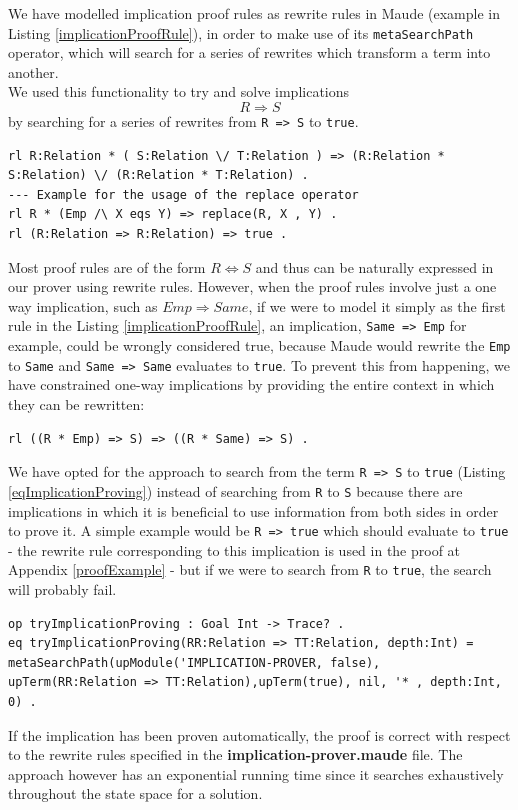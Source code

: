 \documentclass[12pt,a4paper]{article}
\begin{document}
We have modelled implication proof rules as rewrite rules in Maude (example in Listing \ref{implicationProofRule}), in order to make use of its \texttt{metaSearchPath} operator, which will search for a series of rewrites which transform a term into another.
\\
We used this functionality to try and solve implications 
\[
	R \Rightarrow S
\]
by searching for a series of rewrites from \texttt{R => S} to \texttt{true}. 
\\ 
\begin{lstlisting}[label=implicationProofRule,caption=Example of implication rewrite rules]
rl R:Relation * ( S:Relation \/ T:Relation ) => (R:Relation * S:Relation) \/ (R:Relation * T:Relation) .
--- Example for the usage of the replace operator
rl R * (Emp /\ X eqs Y) => replace(R, X , Y) .
rl (R:Relation => R:Relation) => true .
\end{lstlisting}
Most proof rules are of the form \(R \Leftrightarrow S\) and thus can be naturally expressed in our prover using rewrite rules. However, when the proof rules involve just a one way implication, such as \(Emp \Rightarrow Same\), if we were to model it simply as the first rule in the Listing \ref{implicationProofRule}, an implication, \texttt{Same => Emp} for example, could be wrongly considered true, because Maude would rewrite the \texttt{Emp} to \texttt{Same} and \texttt{Same => Same} evaluates to \texttt{true}. To prevent this from happening, we have constrained one-way implications by providing the entire context in which they can be rewritten:
\begin{lstlisting}
rl ((R * Emp) => S) => ((R * Same) => S) .
\end{lstlisting}

We have opted for the approach to search from the term \texttt{R => S} to \texttt{true} (Listing \ref{eqImplicationProving}) instead of searching from \texttt{R} to \texttt{S} because there are implications in which it is beneficial to use information from both sides in order to prove it. A simple example would be \texttt{R => true} which should evaluate to \texttt{true} - the rewrite rule corresponding to this implication is used in the proof at Appendix \ref{proofExample} - but if we were to search from \texttt{R} to \texttt{true}, the search will probably fail.
  
\begin{lstlisting}[label=eqImplicationProving,caption=Equation using the metaSearchPath operator]
op tryImplicationProving : Goal Int -> Trace? .
eq tryImplicationProving(RR:Relation => TT:Relation, depth:Int) = metaSearchPath(upModule('IMPLICATION-PROVER, false), upTerm(RR:Relation => TT:Relation),upTerm(true), nil, '* , depth:Int, 0) . 
\end{lstlisting}
If the implication has been proven automatically, the proof is correct with respect to the rewrite rules specified in the \textbf{implication-prover.maude} file. The approach however has an exponential running time since it searches exhaustively throughout the state space for a solution. \\
\end{document}
